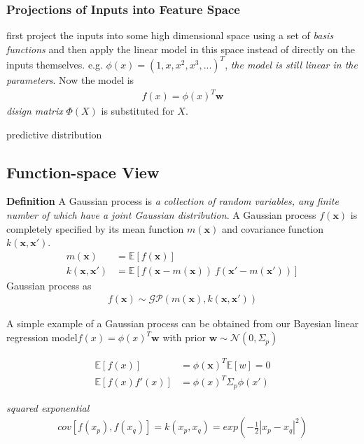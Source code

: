 \documentclass[a4paper]{article}
\begin{document}
\subsubsection{Projections of Inputs into Feature Space}

first project the inputs into some high dimensional space using a set of \emph{basis functions} and then apply the linear model in this space instead of directly on the inputs themselves. e.g. $\phi(x) = (1, x, x^2, x^3,...)^T$, \emph{the model is still linear in the parameters}. Now the model is
\begin{align}
  f(x) = \phi(x)^T \mathbf{w}
\end{align}
\emph{disign matrix} $\Phi(X)$ is substituted for $X$.

predictive distribution


\subsection{Function-space View}

\textbf{Definition} A Gaussian process is \emph{a collection of random variables, any finite number of which have a joint Gaussian distribution}.
A Gaussian process $f(\mathbf{x})$ is completely specified by its mean function $m(\mathbf{x})$ and covariance function $k(\mathbf{x},\mathbf{x}')$.
\begin{align*}
  m(\mathbf{x}) &= \mathbb{E}[f(\mathbf{x})]\\
  k(\mathbf{x},\mathbf{x}') &= \mathbb{E}[f(\mathbf{x}-m(\mathbf{x}))\: f(\mathbf{x}'-m(\mathbf{x}'))]
\end{align*}
Gaussian process as
\begin{align}
  f(\mathbf{x}) \sim \mathscr{G} \mathcal{P}(m(\mathbf{x}), k(\mathbf{x}, \mathbf{x}'))
\end{align}

A simple example of a Gaussian process can be obtained from our Bayesian linear regression model$f(x) = \phi(x)^T\mathbf{w}$ with prior $\mathbf{w} \sim \mathcal{N}(0,\Sigma_p)$

\begin{align*}
  \mathbb{E}[f(x)] &= \phi(\mathbf{x})^T \mathbb{E}[w] = 0\\
  \mathbb{E}[f(x)f'(x)] &= \phi(x)^T \Sigma_p \phi(x')
\end{align*}

\emph{squared exponential}
\begin{align*}
  cov[f(x_p), f(x_q)] = k(x_p,x_q) = exp(-\frac{1}{2} |x_p - x_q|^2)
\end{align*}
\end{document}
